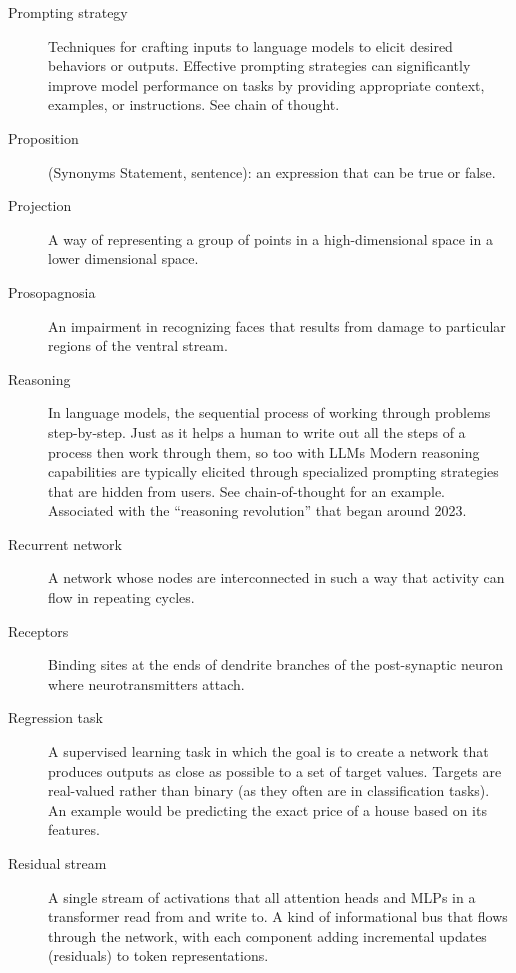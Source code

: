 \begin{description}
\item[Prompting strategy] Techniques for crafting inputs to language models to elicit desired behaviors or outputs. Effective prompting strategies can significantly improve model performance on tasks by providing appropriate context, examples, or instructions. See chain of thought.

\item[Proposition] (Synonyms Statement, sentence): an expression that can be true or false.

\item[Projection] A way of representing a group of points in a high-dimensional space in a lower dimensional space.

\item[Prosopagnosia] An impairment in recognizing faces that results from damage to particular regions of the ventral stream.


\item[Reasoning] In language models, the sequential process of working through problems step-by-step. Just as it helps a human to write out all the steps of a process then work through them, so too with LLMs  Modern reasoning capabilities are typically elicited through specialized prompting strategies that are hidden from users. See chain-of-thought for an example. Associated with the “reasoning revolution” that began around 2023.

\item[Recurrent network] A network whose nodes are interconnected in such a way that activity can flow in repeating cycles.

\item[Receptors] Binding sites at the ends of dendrite branches of the post-synaptic neuron where neurotransmitters attach.


\item[Regression task] A supervised learning task in which the goal is to create a network that produces outputs as close as possible to a set of target values. Targets are real-valued rather than binary (as they often are in classification tasks). An example would be predicting the exact price of a house based on its features.

\item[Residual stream] A single stream of activations that all attention heads and MLPs in a transformer read from and write to. A kind of informational bus that flows through the network, with each component adding incremental updates (residuals) to token representations.


\end{description}
